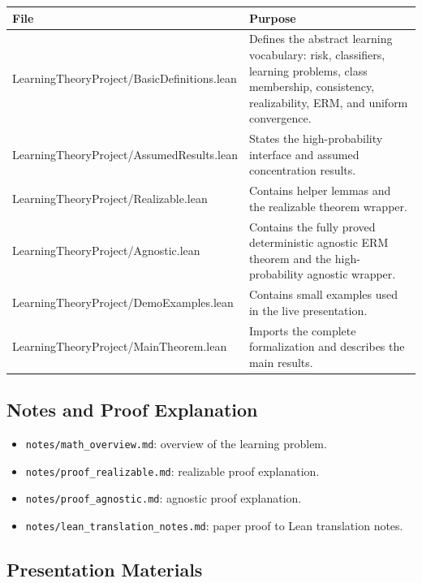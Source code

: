 \documentclass[11pt]{article}
\theoremstyle{definition}
\begin{document}
\begin{longtable}{>{\raggedright\arraybackslash}p{}
                  >{\raggedright\arraybackslash}p{}}
\toprule
\normalfont\textbf{File} & \textbf{Purpose} \\
\midrule
\endhead
\small LearningTheoryProject/BasicDefinitions.lean
& Defines the abstract learning vocabulary: risk, classifiers, learning problems,
class membership, consistency, realizability, ERM, and uniform convergence. \\
\small LearningTheoryProject/AssumedResults.lean
& States the high-probability interface and assumed concentration results. \\
\small LearningTheoryProject/Realizable.lean
& Contains helper lemmas and the realizable theorem wrapper. \\
\small LearningTheoryProject/Agnostic.lean
& Contains the fully proved deterministic agnostic ERM theorem and the
high-probability agnostic wrapper. \\
\small LearningTheoryProject/DemoExamples.lean
& Contains small examples used in the live presentation. \\
\small LearningTheoryProject/MainTheorem.lean
& Imports the complete formalization and describes the main results. \\
\bottomrule
\end{longtable}

\subsection{Notes and Proof Explanation}

\begin{itemize}[leftmargin=*]
  \item \texttt{notes/math\_overview.md}: overview of the learning problem.
  \item \texttt{notes/proof\_realizable.md}: realizable proof explanation.
  \item \texttt{notes/proof\_agnostic.md}: agnostic proof explanation.
  \item \texttt{notes/lean\_translation\_notes.md}: paper proof to Lean translation notes.
\end{itemize}

\subsection{Presentation Materials}
\end{document}
